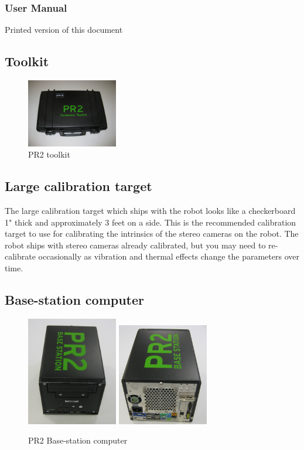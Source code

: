 \subsubsection{User Manual}
Printed version of this document

\subsection{Toolkit}
\begin{figure}[ht]
\centering
\includegraphics[width=150px]{images/toolkit.png}
\caption{PR2 toolkit}
\label{fig:toolkit}
\end{figure}
\label{toolkit}


\subsection{Large calibration target}
The large calibration target which ships with the robot looks like a
checkerboard 1" thick and approximately 3 feet on a side.  This is the
recommended calibration target to use for calibrating the intrinsics of the
stereo cameras on the robot.  The robot ships with stereo cameras already
calibrated, but you may need to re-calibrate occasionally as vibration and
thermal effects change the parameters over time.

\subsection{Base-station computer}
\begin{figure}[ht]
\centering
\includegraphics[width=150px]{images/basestation.png}
\includegraphics[width=150px]{images/basestation_back.png}
\caption{PR2 Base-station computer}
\label{fig:basestation}
\end{figure}
\label{basestation}

